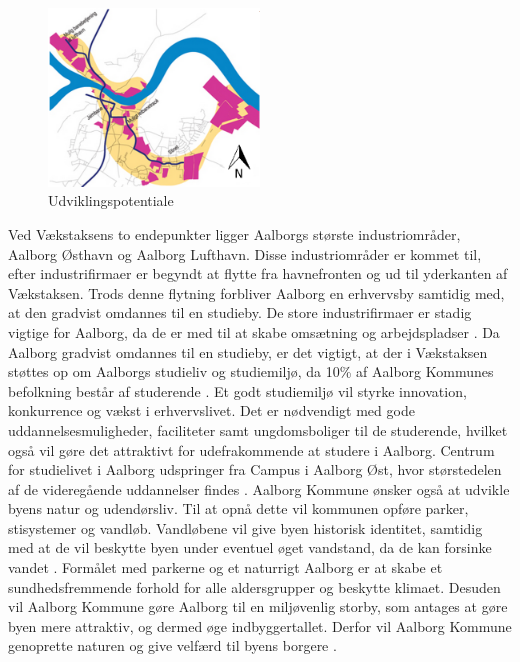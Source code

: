 \begin{figure}[htbp]
	\centering
	\includegraphics[width=0.5\textwidth]{billeder/udvikling.png}
	\caption{Udviklingspotentiale \citep{kommuneplan3}}
	\label{fig:udvikling}
\end{figure}

Ved Vækstaksens to endepunkter ligger Aalborgs største industriområder, Aalborg Østhavn og Aalborg Lufthavn. Disse industriområder er kommet til, efter industrifirmaer er begyndt at flytte fra havnefronten og ud til yderkanten af Vækstaksen. Trods denne flytning forbliver Aalborg en erhvervsby samtidig med, at den gradvist omdannes til en studieby. De store industrifirmaer er stadig vigtige for Aalborg, da de er med til at skabe omsætning og arbejdspladser \citep{kommuneplan3}. 
\newline \indent{     }  Da Aalborg gradvist omdannes til en studieby, er det vigtigt, at der i Vækstaksen støttes op om Aalborgs studieliv og studiemiljø, da 10\% af Aalborg Kommunes befolkning består af studerende \citep{campus}. Et godt studiemiljø vil styrke innovation, konkurrence og vækst i erhvervslivet. Det er nødvendigt med gode uddannelsesmuligheder, faciliteter samt ungdomsboliger til de studerende, hvilket også vil gøre det attraktivt for udefrakommende at studere i Aalborg. Centrum for studielivet i Aalborg udspringer fra Campus i Aalborg Øst, hvor størstedelen af de videregående uddannelser findes \citep{kommuneplan3}. 
\newline
\newline
Aalborg Kommune ønsker også at udvikle byens natur og udendørsliv. Til at opnå dette vil kommunen opføre parker, stisystemer og vandløb. Vandløbene vil give byen historisk identitet, samtidig med at de vil beskytte byen under eventuel øget vandstand, da de kan forsinke vandet \citep{kommuneplan3}. Formålet med parkerne og et naturrigt Aalborg er at skabe et sundhedsfremmende forhold for alle aldersgrupper og beskytte klimaet. Desuden vil Aalborg Kommune gøre Aalborg til en miljøvenlig storby, som antages at gøre byen mere attraktiv, og dermed øge indbyggertallet. Derfor vil Aalborg Kommune genoprette naturen og give velfærd til byens borgere \citep{kommuneplan3}.

